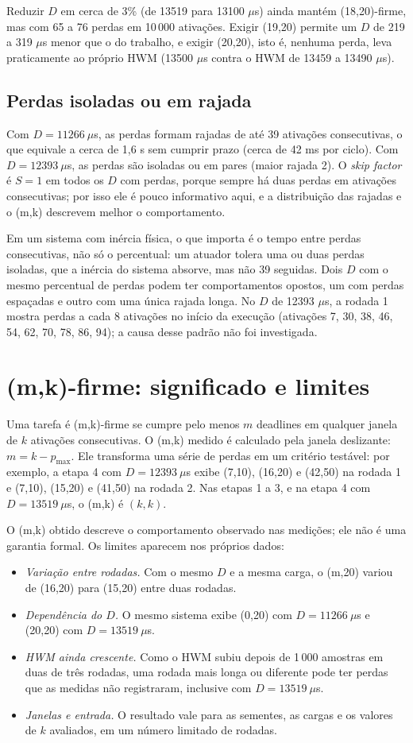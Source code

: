\documentclass[conference,a4paper]{IEEEtran}
\begin{document}
Reduzir $D$ em cerca de 3\% (de 13519 para 13100 $\mu$s) ainda mantém (18,20)-firme, mas com 65 a 76 perdas em 10\,000 ativações. Exigir (19,20) permite um $D$ de 219 a 319 $\mu$s menor que o do trabalho, e exigir (20,20), isto é, nenhuma perda, leva praticamente ao próprio HWM (13500 $\mu$s contra o HWM de 13459 a 13490 $\mu$s).

\subsection{Perdas isoladas ou em rajada}
Com $D = 11266\ \mu$s, as perdas formam rajadas de até 39 ativações consecutivas, o que equivale a cerca de 1,6 s sem cumprir prazo (cerca de 42 ms por ciclo). Com $D = 12393\ \mu$s, as perdas são isoladas ou em pares (maior rajada 2). O \emph{skip factor} é $S = 1$ em todos os $D$ com perdas, porque sempre há duas perdas em ativações consecutivas; por isso ele é pouco informativo aqui, e a distribuição das rajadas e o (m,k) descrevem melhor o comportamento.

Em um sistema com inércia física, o que importa é o tempo entre perdas consecutivas, não só o percentual: um atuador tolera uma ou duas perdas isoladas, que a inércia do sistema absorve, mas não 39 seguidas. Dois $D$ com o mesmo percentual de perdas podem ter comportamentos opostos, um com perdas espaçadas e outro com uma única rajada longa. No $D$ de 12393 $\mu$s, a rodada 1 mostra perdas a cada 8 ativações no início da execução (ativações 7, 30, 38, 46, 54, 62, 70, 78, 86, 94); a causa desse padrão não foi investigada.

\section{(m,k)-firme: significado e limites}
Uma tarefa é (m,k)-firme se cumpre pelo menos $m$ deadlines em qualquer janela de $k$ ativações consecutivas. O (m,k) medido é calculado pela janela deslizante: $m = k - p_{\max}$. Ele transforma uma série de perdas em um critério testável: por exemplo, a etapa 4 com $D = 12393\ \mu$s exibe (7,10), (16,20) e (42,50) na rodada 1 e (7,10), (15,20) e (41,50) na rodada 2. Nas etapas 1 a 3, e na etapa 4 com $D = 13519\ \mu$s, o (m,k) é $(k,k)$.

O (m,k) obtido descreve o comportamento observado nas medições; ele não é uma garantia formal. Os limites aparecem nos próprios dados:
\begin{itemize}
\item \emph{Variação entre rodadas.} Com o mesmo $D$ e a mesma carga, o (m,20) variou de (16,20) para (15,20) entre duas rodadas.
\item \emph{Dependência do $D$.} O mesmo sistema exibe (0,20) com $D = 11266\ \mu$s e (20,20) com $D = 13519\ \mu$s.
\item \emph{HWM ainda crescente.} Como o HWM subiu depois de 1\,000 amostras em duas de três rodadas, uma rodada mais longa ou diferente pode ter perdas que as medidas não registraram, inclusive com $D = 13519\ \mu$s.
\item \emph{Janelas e entrada.} O resultado vale para as sementes, as cargas e os valores de $k$ avaliados, em um número limitado de rodadas.
\end{itemize}
\end{document}
